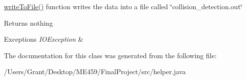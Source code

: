 \mbox{\hyperlink{classhelper_a302277cc0ef6f69877eda1cae4ede979}{write\+To\+File()}} function writes the data into a file called \char`\"{}collision\+\_\+detection.\+out\char`\"{} \begin{DoxyReturn}{Returns}
nothing 
\end{DoxyReturn}

\begin{DoxyExceptions}{Exceptions}
{\em I\+O\+Exception} & \\
\hline
\end{DoxyExceptions}


The documentation for this class was generated from the following file\+:\begin{DoxyCompactItemize}
\item 
/\+Users/\+Grant/\+Desktop/\+M\+E459/\+Final\+Project/src/helper.\+java\end{DoxyCompactItemize}
